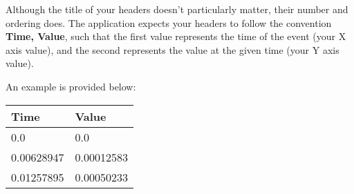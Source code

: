 Although the title of your headers doesn't particularly matter, their number and ordering does. The application expects your headers to follow the convention {\bf Time, Value}, such that the first value represents the time of the event (your X axis value), and the second represents the value at the given time (your Y axis value). 

An example is provided below: 
\begin{table}[!ht]
    \centering
    \begin{tabular}{|l|l|}
    \hline
        {\bf Time} & {\bf Value} \\ \hline
        0.0 & 0.0 \\ \hline
        0.00628947 & 0.00012583 \\ \hline
        0.01257895 & 0.00050233 \\ \hline
    \end{tabular}
\end{table}
